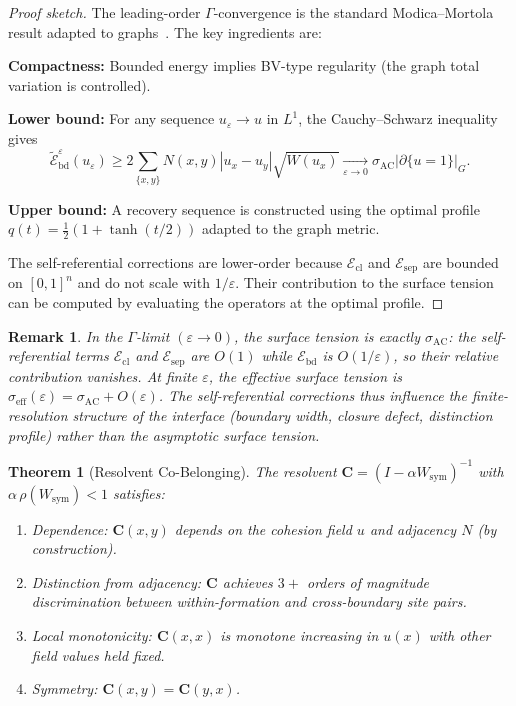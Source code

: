 \documentclass[lettersize,journal]{IEEEtran}
\newtheorem{theorem}{Theorem}
\newtheorem{remark}{Remark}
\begin{document}
\begin{proof}[Proof sketch]
The leading-order $\Gamma$-convergence is the standard Modica--Mortola result adapted to graphs~\cite{vanGennip2012}. The key ingredients are:

\textbf{Compactness:} Bounded energy implies BV-type regularity (the graph total variation is controlled).

\textbf{Lower bound:} For any sequence $u_\varepsilon \to u$ in $L^1$, the Cauchy--Schwarz inequality gives
\[
\widetilde{\mathcal{E}}_{\mathrm{bd}}^\varepsilon(u_\varepsilon) \geq 2\sum_{\{x,y\}} N(x,y)|u_x - u_y|\sqrt{W(u_x)} \xrightarrow[\varepsilon \to 0]{} \sigma_{\mathrm{AC}} |\partial\{u=1\}|_G.
\]

\textbf{Upper bound:} A recovery sequence is constructed using the optimal profile $q(t) = \frac{1}{2}(1 + \tanh(t/2))$ adapted to the graph metric.

The self-referential corrections are lower-order because $\mathcal{E}_{\mathrm{cl}}$ and $\mathcal{E}_{\mathrm{sep}}$ are bounded on $[0,1]^n$ and do not scale with $1/\varepsilon$. Their contribution to the surface tension can be computed by evaluating the operators at the optimal profile.
\end{proof}

\begin{remark}
In the $\Gamma$-limit $(\varepsilon \to 0)$, the surface tension is exactly $\sigma_{\mathrm{AC}}$: the self-referential terms $\mathcal{E}_{\mathrm{cl}}$ and $\mathcal{E}_{\mathrm{sep}}$ are $O(1)$ while $\mathcal{E}_{\mathrm{bd}}$ is $O(1/\varepsilon)$, so their relative contribution vanishes. At finite $\varepsilon$, the effective surface tension is $\sigma_{\mathrm{eff}}(\varepsilon) = \sigma_{\mathrm{AC}} + O(\varepsilon)$. The self-referential corrections thus influence the \emph{finite-resolution} structure of the interface (boundary width, closure defect, distinction profile) rather than the asymptotic surface tension.
\end{remark}

\begin{theorem}[Resolvent Co-Belonging]
\label{thm:resolvent}
The resolvent $\mathbf{C} = (I - \alpha W_{\mathrm{sym}})^{-1}$ with $\alpha\,\rho(W_{\mathrm{sym}}) < 1$ satisfies:
\begin{enumerate}
\item[\textbf{C1}] \emph{Dependence:} $\mathbf{C}(x,y)$ depends on the cohesion field $u$ and adjacency $N$ (by construction).
\item[\textbf{C2}] \emph{Distinction from adjacency:} $\mathbf{C}$ achieves $3+$ orders of magnitude discrimination between within-formation and cross-boundary site pairs.
\item[\textbf{C3$''$}] \emph{Local monotonicity:} $\mathbf{C}(x,x)$ is monotone increasing in $u(x)$ with other field values held fixed.
\item[\textbf{C4}] \emph{Symmetry:} $\mathbf{C}(x,y) = \mathbf{C}(y,x)$.
\end{enumerate}
\end{theorem}
\end{document}
